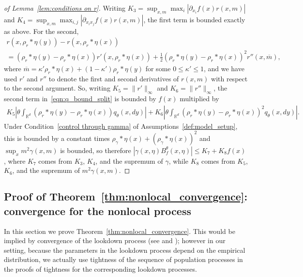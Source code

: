\documentclass[EJP]{ejpecp} %
\newcommand{\IR}{\mathbb R}
\newcommand{\kernel}{\rho}  %
\newcommand{\smooth}[1]{\kernel_{#1} \! * \!}  %
\newcommand{\citet}[1]{\cite{#1}}
\begin{document}
\begin{proof}[of Lemma~\ref{lem:conditions on r}]
Writing
$K_3 = \sup_{x,m} \max_i |\partial_{x_i} f(x)r(x, m)|$
and 
$K_4 = \sup_{x,m} \max_{i,j} |\partial_{x_i x_j} f(x)r(x, m)|$,
the first term is bounded exactly as above. For the second, 
    \begin{multline*}
        r(x, \smooth{r}\eta(y)) - r(x, \smooth{r}\eta(x))
        \\
        =
        (\smooth{r}\eta(y) - \smooth{r}\eta(x)) r'(x,\smooth{r}\eta(x))
        + \frac{1}{2} (\smooth{r}\eta(y) - \smooth{r}\eta(x))^2 r''(x, \overline{m}),
    \end{multline*}
    where $\overline{m}= \kappa'\smooth{r}\eta(x) +(1-\kappa') 
\smooth{r}\eta(y)$ for some $0\leq \kappa'\leq 1$, and
    we have used $r'$ and $r''$ to denote the first and second derivatives of $r(x,m)$
with respect to the second argument.
    So, writing $K_5=\|r'\|_\infty$ and $K_6=\|r''\|_\infty$,
    the second term in~\eqref{eqn:q_bound_split} is bounded by $f(x)$ multiplied by
    \begin{align*}
       K_5
        \left|
            \theta \int_{\IR^d}
                (\smooth{r}\eta(y) - \smooth{r}\eta(x))
            q_\theta(x, dy)
        \right|
        +
       K_6
        \left|
            \theta \int_{\IR^d}
                (\smooth{r}\eta(y) - \smooth{r}\eta(x))^2
            q_\theta(x, dy)
        \right| .
    \end{align*}
Under Condition~\ref{control through gamma} of 
Assumptions~\ref{def:model_setup}, this is bounded by 
a constant times $\smooth{\gamma}\eta(x)+(\smooth{\gamma}\eta(x))^2$ and 
$\sup_x m^2\gamma(x, m)$ is bounded,
so therefore $|\gamma(x,\eta) B^\theta_f(x,\eta)| \le K_7 + K_8 f(x)$,
where $K_7$ comes from $K_3$, $K_4$, and the supremum of $\gamma$,
while $K_8$ comes from $K_5$, $K_6$, and the supremum of $m^2 \gamma(x,m)$.
\end{proof}


\subsection{Proof of Theorem~\ref{thm:nonlocal_convergence}: convergence for the nonlocal process}
    \label{sec:population_density_proof}

In this section we prove Theorem~\ref{thm:nonlocal_convergence}.
This would be implied by convergence of the lookdown process
(see \citet{kurtz/rodrigues:2011} and \citet{etheridge/kurtz:2019});
however in our setting,
because the parameters in the lookdown process
depend on the empirical distribution,
we actually use tightness of the sequence of population processes
in the proofs of tightness for the corresponding lookdown processes.
\end{document}
